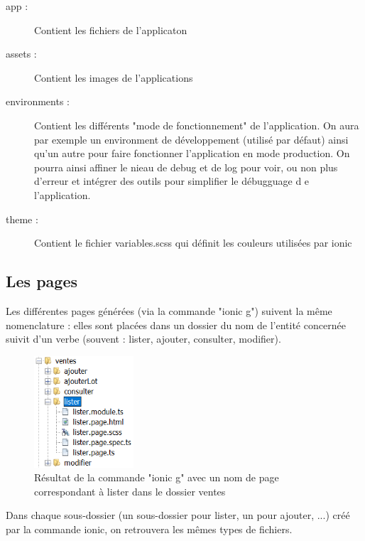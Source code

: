 			\begin{description}
				\item[app :]{Contient les fichiers de l'applicaton}
				\item[assets :]{Contient les images de l'applications}
				\item[environments :]{Contient les différents "mode de fonctionnement" de l'application. On aura par exemple un environment de développement (utilisé par défaut) ainsi qu'un autre pour faire fonctionner l'application en mode production. On pourra ainsi affiner le nieau de debug et de log pour voir, ou non plus d'erreur et intégrer des outils pour simplifier le débugguage d e l'application.}
				\item[theme :]{Contient le fichier variables.scss qui définit les couleurs utilisées par ionic}
			\end{description}

		\subsection{Les pages}

			Les différentes pages générées (via la commande "ionic g") suivent la même nomenclature : elles sont placées dans un dossier du nom de l'entité concernée suivit d'un verbe (souvent : lister, ajouter, consulter, modifier). \newline

			\begin{figure}[H]
				\centering\includegraphics[width=0.33\textwidth, keepaspectratio]{res/ionicListerVentes.png}
				\caption{Résultat de la commande "ionic g" avec un nom de page correspondant à lister dans le dossier ventes}
			\end{figure}

			Dans chaque sous-dossier (un sous-dossier pour lister, un pour ajouter, ...) créé par la commande ionic, on retrouvera les mêmes types de fichiers.\newline

